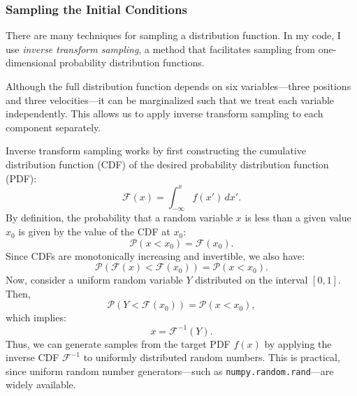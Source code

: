         \subsubsection{Sampling the Initial Conditions}
            There are many techniques for sampling a distribution function. In my code, I use \textit{inverse transform sampling}, a method that facilitates sampling from one-dimensional probability distribution functions.

            Although the full distribution function depends on six variables—three positions and three velocities—it can be marginalized such that we treat each variable independently. This allows us to apply inverse transform sampling to each component separately.

            Inverse transform sampling works by first constructing the cumulative distribution function (CDF) of the desired probability distribution function (PDF):
            \begin{equation}
                \mathcal{F}(x) = \int_{-\infty}^{x} f(x')\,dx'.
            \end{equation}
            By definition, the probability that a random variable $x$ is less than a given value $x_0$ is given by the value of the CDF at $x_0$:
            \begin{equation}
                \mathcal{P}(x < x_0) = \mathcal{F}(x_0).
            \end{equation}
            Since CDFs are monotonically increasing and invertible, we also have:
            \begin{equation}
                \mathcal{P}(\mathcal{F}(x) < \mathcal{F}(x_0)) = \mathcal{P}(x < x_0).
            \end{equation}
            Now, consider a uniform random variable $Y$ distributed on the interval $[0,1]$. Then,
            \begin{equation}
                \mathcal{P}(Y < \mathcal{F}(x_0)) = \mathcal{P}(x < x_0),
            \end{equation}
            which implies:
            \begin{equation}
                x = \mathcal{F}^{-1}(Y).
            \end{equation}
            Thus, we can generate samples from the target PDF $f(x)$ by applying the inverse CDF $\mathcal{F}^{-1}$ to uniformly distributed random numbers. This is practical, since uniform random number generators—such as \texttt{numpy.random.rand}—are widely available.

